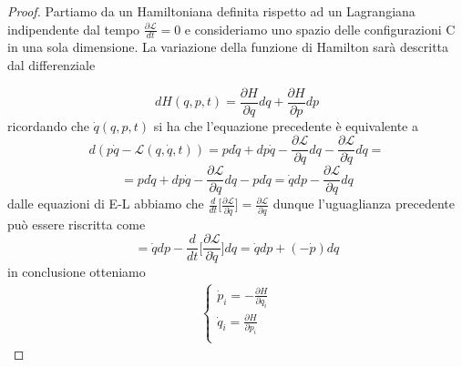 \begin{proof}
Partiamo da un Hamiltoniana definita rispetto ad un Lagrangiana indipendente dal tempo $\frac{\partial \mathcal{L}}{dt} = 0$ e consideriamo uno spazio delle configurazioni C in una sola dimensione. La variazione della funzione di Hamilton sar\`{a} descritta dal differenziale

\begin{equation*}
	d H(q, p, t)=\frac{\partial H}{\partial q} d q+\frac{\partial H}{\partial p} d p
\end{equation*}
\newline
ricordando che $\dot q (q,p,t)$ si ha che l'equazione precedente \`{e} equivalente a 
\begin{equation*}
	d(p \dot{q}-\mathcal{L}(q, \dot{q}, t))= pd\dot q +dp \dot q - \dfrac{\partial \mathcal{L}}{\partial q}dq - \dfrac{\partial \mathcal{L}}{\partial \dot q}d \dot q =
\end{equation*}
\begin{equation*}
	= pd\dot q +dp \dot q - \dfrac{\partial \mathcal{L}}{\partial q}dq - pd \dot q = \dot q dp - \dfrac{\partial \mathcal{L}}{\partial q}dq
\end{equation*}
\newline
dalle equazioni di E-L abbiamo che $\frac{d}{dt} \big [ \frac{\partial \mathcal{L}}{\partial \dot q} \big ] =\frac{\partial \mathcal{L}}{\partial  q} $ dunque l'uguaglianza precedente pu\`{o} essere riscritta come
\begin{equation*}
	=\dot q dp - \dfrac{d}{dt} \Big [\dfrac{\partial \mathcal{L}}{\partial \dot q} \Big ]dq = \dot q dp  + (- \dot p)dq
\end{equation*}
in conclusione otteniamo 
\begin{align*}
	\begin{cases}
	\dot{p}_i  =-\frac{\partial H}{\partial q_i} \\
	\dot{q}_i  =\frac{\partial H}{\partial p_i} \\
	\end{cases}
\end{align*}
\end{proof}

